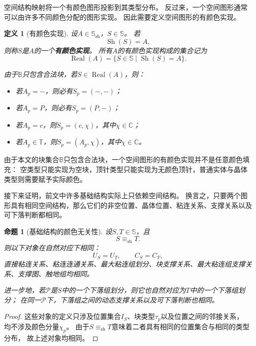 \documentclass[UTF8,fontset=none]{ctexart}
\theoremstyle{cnthm}
\newtheorem{definition}{定义}[section]
\newtheorem{proposition}{命题}[section]
\begin{document}
			空间结构映射将一个有颜色图形投影到其类型分布。
			反过来，一个空间图形通常可以由许多不同颜色分配的图形实现。
			因此需要定义空间图形的有颜色实现。
			
			\begin{definition}[有颜色实现]
				设$A\in\mathbb{S}_{\mathrm{sh}}$，$S\in\mathbb{S}$。
				若
				$$
				\operatorname{Sh}(S)=A,
				$$
				则称$S$是$A$的一个\textbf{有颜色实现}。
				所有$A$的有颜色实现构成的集合记为
				$$
				\operatorname{Real}(A)
				=
				\{S\in\mathbb{S}\mid \operatorname{Sh}(S)=A\}.
				$$
				
				由于$\mathbb{B}$只包含合法块，若$S\in\operatorname{Real}(A)$，则：
				\begin{itemize}
					\item 若$A_p=-$，则必有$S_p=(-,-)$；
					\item 若$A_p=P$，则必有$S_p=(P,-)$；
					\item 若$A_p=c$，则$S_p=(c,\chi)$，其中$\chi\in\mathbb{C}$；
					\item 若$A_p\in\mathbb{T}$，则$S_p=(A_p,\chi)$，其中$\chi\in\mathbb{C}$。
				\end{itemize}
			\end{definition}
			
			由于本文的块集合$\mathbb{B}$只包含合法块，一个空间图形的有颜色实现并不是任意颜色填充：
			空类型只能实现为空块，顶针类型只能实现为无颜色顶针，普通实体与晶体类型则需要赋予实际颜色。
			
			接下来证明，前文中许多基础结构实际上只依赖空间结构。
			换言之，只要两个图形具有相同空间结构，那么它们的非空位置、晶体位置、粘连关系、支撑关系以及可下落判断都相同。
			
			\begin{proposition}[基础结构的颜色无关性]\label{prop:basic-shape-invariance}
				设$S,T\in\mathbb{S}$，且
				$$
				S\equiv_{\mathrm{sh}}T.
				$$
				则以下对象在自然对应下相同：
				$$
				U_S=U_T,\qquad C_S=C_T,
				$$
				直接粘连关系、粘连连通关系、最大粘连组划分、块支撑关系、最大粘连组支撑关系、支撑图、触地组均相同。
				
				进一步地，若$\mathcal{P}$是$S$中的一个下落组划分，则它也自然对应为$T$中的一个下落组划分；
				在同一$\mathcal{P}$下，下落组之间的动态支撑关系以及可下落判断也相同。
			\end{proposition}
			
			\begin{proof}
				这些对象的定义只涉及位置集合$I_S$、块类型$\tau_p$以及位置之间的邻接关系，
				均不涉及颜色分量$\chi_p$。
				由于$S\equiv_{\mathrm{sh}}T$意味着二者具有相同的位置集合与相同的类型分布，
				故上述对象均相同。
			\end{proof}
			
\end{document}
